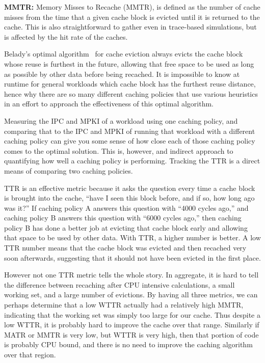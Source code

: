 \textbf{MMTR:}
Memory Misses to Recache (MMTR), is defined as the number of cache misses from the time that a given cache block is evicted until it is returned to the cache.
This is also straightforward to gather even in trace-based simulations, but is affected by the hit rate of the caches.

Belady's optimal algorithm~\cite{belady66} for cache eviction always evicts the cache block whose reuse is furthest in the future,
allowing that free space to be used as long as possible by other data before being recached.
It is impossible to know at runtime for general workloads which cache block has the furthest reuse distance,
 hence why there are so many different caching policies that use various heuristics in an effort to approach the effectiveness of this optimal algorithm.

Measuring the IPC and MPKI of a workload using one caching policy,
 and comparing that to the IPC and MPKI of running that workload with a different caching policy can give you some sense of how close each of those caching policy comes to the optimal solution.
This is, however, and indirect approach to quantifying how well a caching policy is performing.
Tracking the TTR is a direct means of comparing two caching policies.

TTR is an effective metric because it asks the question every time a cache block is brought into the cache,
 ``have I seen this block before, and if so, how long ago was it?''
If caching policy A answers this question with ``4000 cycles ago,''
 and caching policy B answers this question with ``6000 cycles ago,''
 then caching policy B has done a better job at evicting that cache block early and allowing that space to be used by other data.
With TTR, a higher number is better.
A low TTR number means that the cache block was evicted and then recached very soon afterwards,
 suggesting that it should not have been evicted in the first place.

However not one TTR metric tells the whole story.
In aggregate, it is hard to tell the difference between recaching after CPU intensive calculations, a small working set, and a large number of evictions.
By having all three metrics, we can perhaps determine that a low WTTR actually had a relatively high MMTR, indicating that the working set was simply too large for our cache.
Thus despite a low WTTR, it is probably hard to improve the cache over that range.
Similarly if MATR or MMTR is very low, but WTTR is very high, then that portion of code is probably CPU bound, and there is no need to improve the caching algorithm over that region.

